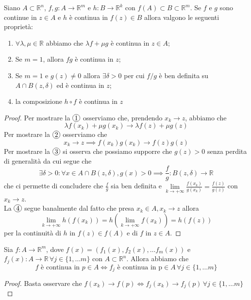 \begin{theorem}[teorema C2]
Siano $A \subset \mathbb{R}^n$, $f, g: A \to \mathbb{R}^m$ e $h: B \to \mathbb{R}^k$ con $f(A) \subset B \subset \mathbb{R}^m$. Se $f$ e $g$ sono continue in $z \in A$ e $h$ è continua in $f(z) \in B$ allora valgono le seguenti proprietà:
\begin{enumerate}[label=\protect\circled{\arabic*}]
	\item $\forall \lambda, \mu \in \mathbb{R}$ abbiamo che $\lambda f + \mu g$ è continua in $z \in A$;
	\item Se $m = 1$, allora $fg$ è continua in $z$;
	\item Se $m=1$ e $g(z) \neq 0$ allora $\exists \delta > 0$ per cui $f/g$ è ben definita su $A \cap B(z, \delta)$ ed è continua in $z$;
	 \item la composizione $h \circ f$ è continua in $z$
\end{enumerate}
\end{theorem}
\begin{proof}
Per mostrare la $\circled{1}$ osserviamo che, prendendo $x_k \to z$, abbiamo che
$$
\lambda f(x_k) + \mu g(x_k) \to \lambda f(z) + \mu g(z)
$$
Per mostrare la $\circled{2}$ osserviamo che
$$
x_k \to z \implies f(x_k)g(x_k) \to f(z)g(z)
$$
Per mostrare la $\circled{3}$ si osserva che possiamo supporre che $g(z) > 0$ senza perdita di generalità da cui segue che
$$
\exists \delta > 0: \forall x \in A \cap B(z, \delta), g(x) > 0 \implies \frac{f}{g}: B(z, \delta) \to \mathbb{R}
$$
che ci permette di concludere che $\frac{f}{g}$ sia ben definita e $\lim\limits_{k \to +\infty} \frac{f(x_k)}{g(x_k)} = \frac{f(z)}{g(z)}$ con $x_k \to z$. \\
La $\circled{4}$ segue banalmente dal fatto che presa $x_k \in A, x_k \to z$ allora
$$
\lim_{k \to +\infty} h(f(x_k)) = h(\lim_{k \to +\infty} f(x_k)) = h(f(z))
$$
per la continuità di $h$ in $f(z) \in f(A)$ e di $f$ in $z \in A$.
\end{proof}
\begin{prop}
Sia $f: A \to \mathbb{R}^m$, dove $f(x) = (f_1(x), f_2(x), \ldots f_m(x))$ e $f_j(x): A \to \mathbb{R} \, \forall j \in \{1, \ldots m\}$ con $A \subset \mathbb{R}^n$. Allora abbiamo che
	$$f \text{ è continua in } p \in A \iff f_j \text{ è continua in p} \in A \, \forall j \in \{1, \ldots m\}$$
\end{prop}
\begin{proof}
Basta osservare che $f(x_k) \to f(p) \iff f_j(x_k) \to f_j(p) \, \forall j \in \{1, \ldots m \}$
\end{proof}
